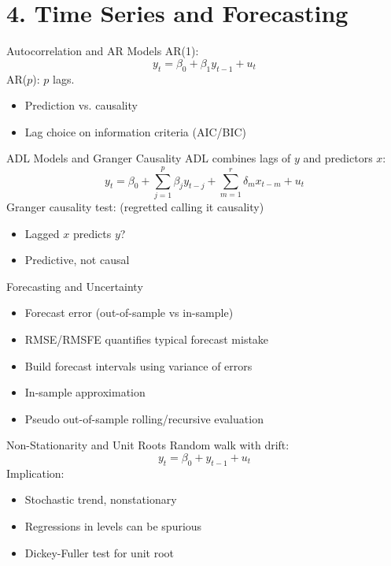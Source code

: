 \documentclass[aspectratio=169]{beamer}
\begin{document}
\section{4. Time Series and Forecasting}

\begin{frame}{Autocorrelation and AR Models}
AR(1):
\[
y_t = \beta_0 + \beta_1 y_{t-1} + u_t
\]
AR($p$): $p$ lags.
\begin{itemize}
	\item Prediction vs. causality
	\item Lag choice on information criteria (AIC/BIC)
\end{itemize}
\end{frame}

\begin{frame}{ADL Models and Granger Causality}
ADL combines lags of $y$ and predictors $x$:
\[
y_t = \beta_0 + \sum_{j=1}^p \beta_j y_{t-j} + \sum_{m=1}^r \delta_m x_{t-m} + u_t
\]
Granger causality test: (regretted calling it causality)
\begin{itemize}
	\item Lagged $x$ predicts $y$?
	\item Predictive, not causal
\end{itemize}
\end{frame}

\begin{frame}{Forecasting and Uncertainty}
\begin{itemize}
	\item Forecast error (out-of-sample vs in-sample)
	\item RMSE/RMSFE quantifies typical forecast mistake
	\item Build forecast intervals using variance of errors
	\item In-sample approximation
	\item Pseudo out-of-sample rolling/recursive evaluation
\end{itemize}
\end{frame}

\begin{frame}{Non-Stationarity and Unit Roots}
Random walk with drift:
\[
y_t = \beta_0 + y_{t-1} + u_t
\]
Implication:
\begin{itemize}
	\item Stochastic trend, nonstationary
	\item Regressions in levels can be spurious
	\item Dickey-Fuller test for unit root
\end{itemize}
\end{frame}
\end{document}
